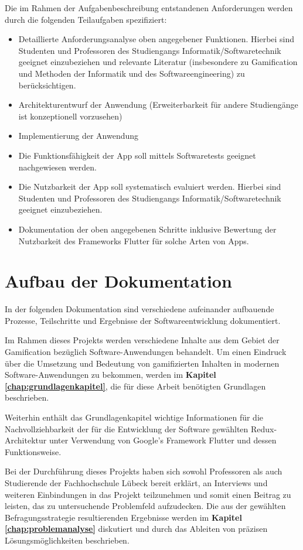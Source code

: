 \documentclass[bibliography=totoc,listof=totoc,BCOR=5mm,DIV=12,oneside]{scrbook}
\begin{document}
\par Die im Rahmen der Aufgabenbeschreibung entstandenen Anforderungen werden durch die folgenden Teilaufgaben spezifiziert:
\begin{itemize}
\item Detaillierte Anforderungsanalyse oben angegebener Funktionen. Hierbei sind Studenten und Professoren des Studiengangs Informatik/Softwaretechnik geeignet einzubeziehen und relevante Literatur (insbesondere zu Gamification und Methoden der Informatik und des Softwareengineering) zu berücksichtigen.
\item Architekturentwurf der Anwendung (Erweiterbarkeit für andere Studiengänge ist konzeptionell vorzusehen)
\item Implementierung der Anwendung
\item Die Funktionsfähigkeit der App soll mittels Softwaretests geeignet nachgewiesen werden.
\item Die Nutzbarkeit der App soll systematisch evaluiert werden. Hierbei sind Studenten und Professoren des Studiengangs Informatik/Softwaretechnik geeignet einzubeziehen.
\item Dokumentation der oben angegebenen Schritte inklusive Bewertung der Nutzbarkeit des Frameworks Flutter für solche Arten von Apps.
\end{itemize}

\newpage
\section{Aufbau der Dokumentation}
\par In der folgenden Dokumentation sind verschiedene aufeinander aufbauende Prozesse, Teilschritte und Ergebnisse der Softwareentwicklung dokumentiert. 

\par \bigskip Im Rahmen dieses Projekts werden verschiedene Inhalte aus dem Gebiet der Gamification bezüglich Software-Anwendungen behandelt. Um einen Eindruck über die Umsetzung und Bedeutung von gamifizierten Inhalten in modernen Software-Anwendungen zu bekommen, werden im \textbf{Kapitel \ref{chap:grundlagenkapitel}}, die für diese Arbeit benötigten Grundlagen beschrieben.
\par Weiterhin enthält das Grundlagenkapitel wichtige Informationen für die Nachvollziehbarkeit der für die Entwicklung der Software gewählten Redux-Architektur unter Verwendung von Google's Framework Flutter und dessen Funktionsweise.

\par \bigskip Bei der Durchführung dieses Projekts haben sich sowohl Professoren als auch Studierende der Fachhochschule Lübeck bereit erklärt, an Interviews und weiteren Einbindungen in das Projekt teilzunehmen und somit einen Beitrag zu leisten, das zu untersuchende Problemfeld aufzudecken. Die aus der gewählten Befragungsstrategie resultierenden Ergebnisse werden im \textbf{Kapitel \ref{chap:problemanalyse}} diskutiert und durch das Ableiten von präzisen Lösungsmöglichkeiten beschrieben.
\end{document}
